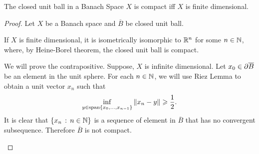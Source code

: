 \documentclass[12pt]{article}
\begin{document}
\begin{fcor} \label{cor : compact closed unit ball} 
    The closed unit ball in a Banach Space $X$ is compact iff $X$ is finite dimensional. 
\end{fcor}
\begin{proof}
    Let $X$ be a Banach space and $\overline{B}$ be closed unit ball. 
    \begin{case}[ $\Longleftarrow$ ] If $X$ is finite dimensional, it is isometrically isomorphic to $\R^n$ for some $n \in \N$, where, by Heine-Borel theorem, the closed unit ball is compact. 
    \end{case}
    
    
    \begin{case}[$\implies$] We will prove the contrapositive. Suppose, $X$ is infinite dimensional. Let $x_0 \in \p \overline{B}$ be an element in the unit sphere. For each $n \in \N$, we will use Riez Lemma to obtain a unit vector $x_n$ such that 
        $$\inf_{y \in \mathrm{span}\set{x_0, \dots, x_{n - 1}}} \norm[x_n - y] \geq \frac{1}{2}. $$
        It is clear that $\set{x_n \wh n \in \N}$ is a sequence of element in $\overline{B}$ that has no convergent subsequence. Therefore $\overline{B}$ is not compact. 
    \end{case}
\end{proof}
\end{document}
